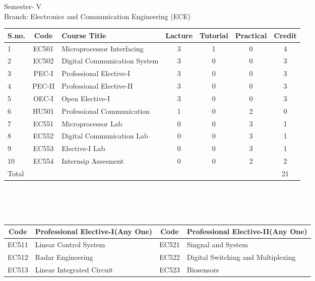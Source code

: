 \documentclass{article}
\begin{document}
    \centering
        Semester- V\\
        Branch: Electronics and Communication Engineering (ECE)\\
    \begin{table}[h!]
        \begin{tabular}{|l|c|p{}|c|c|c|c|}
            \hline
            \textbf{S.no.} & \textbf{Code} & \textbf{Course Title} & \textbf{Lacture} & \textbf{Tutorial} & \textbf{Practical} & \textbf{Credit}\\
            \hline
            1 & EC501 & Microprocessor Interfacing & 3 & 1 & 0 & 4\\ \hline
            2 & EC502 & Digital Communication System & 3 & 0 & 0 & 3\\ \hline
            3 & PEC-I & Professional Elective-I & 3 & 0 & 0 & 3\\ \hline
            4 & PEC-II & Professional Elective-II & 3 & 0 & 0 & 3\\ \hline
            5 & OEC-I & Open Elective-I & 3 & 0 & 0 & 3\\ \hline
            6 & HU501 & Professional Communication & 1 & 0 & 2 & 0\\ \hline
            7 & EC551 & Microprocessor Lab & 0 & 0 & 3 & 1\\ \hline
            8 & EC552 & Digital Communication Lab & 0 & 0 & 3 & 1\\ \hline
            9 & EC553 & Elective-I Lab & 0 & 0 & 3 & 1\\ \hline
            10 & EC554 & Internsip Assesment & 0 & 0 & 2 & 2\\ \hline
            \multicolumn{6}{|l|}{Total}& 21\\
            \hline
        \end{tabular}
        \\
        \\
        \\
        \begin{tabular}{|c|p{}|c|p{}|}
            \hline
            \textbf{Code} & \textbf{Professional Elective-I(Any One)} & \textbf{Code} & \textbf{Professional Elective-II(Any One)} \\ \hline
            EC511 & Linear Control System & EC521 & Singnal and System\\ \hline
            EC512 & Radar Engineering & EC522 & Digital Switching and Multiplexing\\ \hline
            EC513 & Linear Integrated Circuit & EC523 & Biosensors\\ \hline

\end{tabular}
\end{table}
\end{document}

